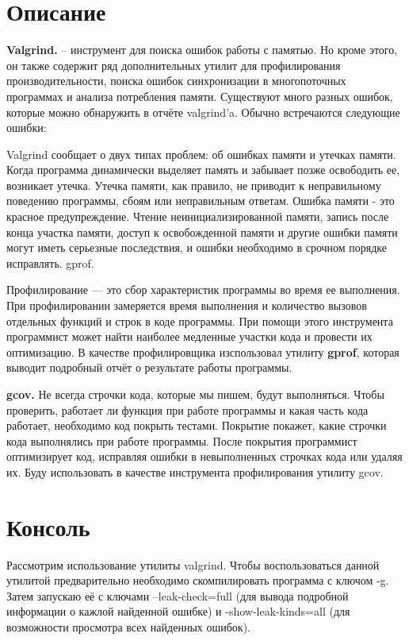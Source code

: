 \section{Описание}
\textbf{Valgrind.} – инструмент для поиска ошибок работы с памятью.
Но кроме этого, он также содержит ряд дополнительных утилит для профилирования производительности, поиска ошибок синхронизации в многопоточных программах и анализа потребления памяти. Существуют много разных ошибок, которые
можно обнаружить в отчёте valgrind’a. Обычно встречаются следующие ошибки:

Valgrind сообщает о двух типах проблем: об ошибках памяти и утечках памяти.
Когда программа динамически выделяет память и забывает позже освободить ее,
возникает утечка. Утечка памяти, как правило, не приводит к неправильному поведению программы, сбоям или неправильным ответам. Ошибка памяти - это красное
предупреждение. Чтение неинициализированной памяти, запись после конца участка памяти, доступ к освобожденной памяти и другие ошибки памяти могут иметь
серьезные последствия, и ошибки необходимо в срочном порядке исправлять.
gprof. 

Профилирование — это сбор характеристик программы во время ее выполнения. При профилировании замеряется время выполнения и количество вызовов
отдельных функций и строк в коде программы. При помощи этого инструмента программист может найти наиболее медленные участки кода и провести их оптимизацию. В качестве профилировщика изспользовал утилиту \textbf{gprof}, которая выводит
подробный отчёт о результате работы программы.

\textbf{gcov.} Не всегда строчки кода, которые мы пишем, будут выполняться. Чтобы проверить, работает ли функция при работе программы и какая часть кода работает,
необходимо код покрыть тестами. Покрытие покажет, какие строчки кода выполнялись при работе программы. После покрытия программист оптимизирует код, исправляя ошибки в невыполненных строчках кода или удаляя их. Буду использовать
в качестве инструмента профилирования утилиту gcov.


\pagebreak

\section{Консоль}
Рассмотрим использование утилиты valgrind. Чтобы воспользоваться данной утилитой предварительно необходимо скомпилировать программа с ключом -g. Затем запускаю её с ключами –leak-check=full (для вывода подробной информации о кажлой
найденной ошибке) и -show-leak-kinds=all (для возможности просмотра всех найденных ошибок).

